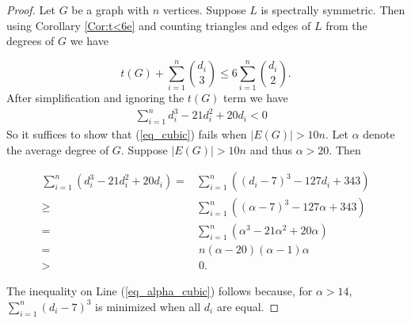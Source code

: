 \documentclass[10pt,a4paper]{amsart}
\newcommand{\ssymend}[0]{spectrally symmetric}
\begin{document}
\begin{proof}

Let $G$ be a graph with $n$ vertices. Suppose $L$ is \ssymend. Then using Corollary \ref{Cor:t<6e} and counting triangles and edges of $L$ from the degrees of $G$ we have

\[t(G)+\sum_{i=1}^n\binom{d_i}{3}\le6\sum_{i=1}^n\binom{d_i}{2}.\]
After simplification and ignoring the $t(G)$ term we have
\begin{align}\sum\limits_{i=1}^nd_i^3-21d_i^2+20d_i<0\hspace{10pt} \label{eq_cubic}
\end{align}
So it suffices to show that  (\ref{eq_cubic}) fails when $|E(G)|> 10n$. Let $\alpha$ denote the average degree of $G$. Suppose $|E(G)|> 10n$ and thus $\alpha>20$. Then

\begin{align}\sum\limits_{i=1}^n(d_i^3-21d_i^2+20d_i)=&\sum_{i=1}^n((d_i-7)^3-127d_i+343)\nonumber\\ 
\geq&\sum_{i=1}^n((\alpha-7)^3-127\alpha+343)\label{eq_alpha_cubic}\\
=&\sum\limits_{i=1}^n(\alpha^3-21\alpha^2+20\alpha)\nonumber\\
=&~n(\alpha-20)(\alpha-1)\alpha \nonumber\\
>&~0.\nonumber\end{align}

The inequality on Line (\ref{eq_alpha_cubic}) follows because, for $\alpha>14$, $\sum_{i=1}^n(d_i-7)^3$ is minimized when all $d_i$ are equal.
\end{proof}
\end{document}
